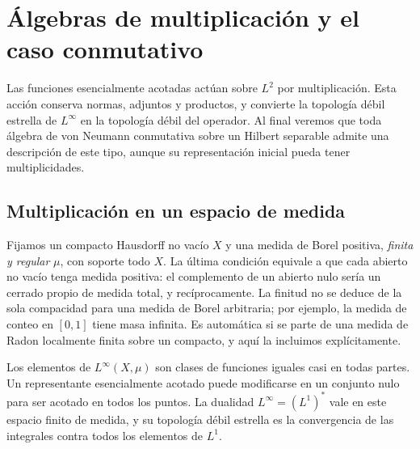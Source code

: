 \chapter{Álgebras de multiplicación y el caso conmutativo}\label{cap:v3-18}

Las funciones esencialmente acotadas actúan sobre $L^2$ por multiplicación. Esta acción conserva normas, adjuntos y productos, y convierte la topología débil estrella de $L^\infty$ en la topología débil del operador. Al final veremos que toda álgebra de von Neumann conmutativa sobre un Hilbert separable admite una descripción de este tipo, aunque su representación inicial pueda tener multiplicidades.

\section{Multiplicación en un espacio de medida}\label{lec:v3-35}

Fijamos un compacto Hausdorff no vacío $X$ y una medida de Borel positiva, \emph{finita y regular} $\mu$, con soporte todo $X$. La última condición equivale a que cada abierto no vacío tenga medida positiva: el complemento de un abierto nulo sería un cerrado propio de medida total, y recíprocamente. La finitud no se deduce de la sola compacidad para una medida de Borel arbitraria; por ejemplo, la medida de conteo en $[0,1]$ tiene masa infinita. Es automática si se parte de una medida de Radon localmente finita sobre un compacto, y aquí la incluimos explícitamente.

Los elementos de $L^\infty(X,\mu)$ son clases de funciones iguales casi en todas partes. Un representante esencialmente acotado puede modificarse en un conjunto nulo para ser acotado en todos los puntos. La dualidad $L^\infty=(L^1)^*$ vale en este espacio finito de medida, y su topología débil estrella es la convergencia de las integrales contra todos los elementos de $L^1$.

